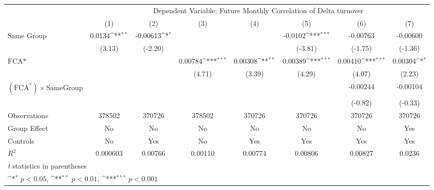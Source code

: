 {
\def\sym#1{\ifmmode^{#1}\else\(^{#1}\)\fi}
\begin{tabular}{l*{7}{c}}
\hline\hline
                &\multicolumn{7}{c}{Dependent Variable: Future Monthly Correlation of Delta turnover}                                                \\\cmidrule(lr){2-8}
                &\multicolumn{1}{c}{(1)}         &\multicolumn{1}{c}{(2)}         &\multicolumn{1}{c}{(3)}         &\multicolumn{1}{c}{(4)}         &\multicolumn{1}{c}{(5)}         &\multicolumn{1}{c}{(6)}         &\multicolumn{1}{c}{(7)}         \\
\hline
Same Group      &   0.0134\sym{**} & -0.00613\sym{*}  &                  &                  &  -0.0102\sym{***}& -0.00763         & -0.00600         \\
                &   (3.13)         &  (-2.20)         &                  &                  &  (-3.81)         &  (-1.75)         &  (-1.36)         \\
[1em]
$ \text{FCA*} $ &                  &                  &  0.00784\sym{***}&  0.00308\sym{**} &  0.00389\sym{***}&  0.00410\sym{***}&  0.00304\sym{*}  \\
                &                  &                  &   (4.71)         &   (3.39)         &   (4.29)         &   (4.07)         &   (2.23)         \\
[1em]
 $ (\text{FCA}^*) \times {\text{SameGroup} }  $ &                  &                  &                  &                  &                  & -0.00244         & -0.00104         \\
                &                  &                  &                  &                  &                  &  (-0.82)         &  (-0.33)         \\
\hline
Observations    &   378502         &   370726         &   378502         &   370726         &   370726         &   370726         &   370726         \\
Group Effect    &       No         &       No         &       No         &       No         &       No         &       No         &      Yes         \\
Controls        &       No         &      Yes         &       No         &      Yes         &      Yes         &      Yes         &      Yes         \\
$ R^2 $         & 0.000603         &  0.00766         &  0.00110         &  0.00774         &  0.00806         &  0.00827         &   0.0236         \\
\hline\hline
\multicolumn{8}{l}{\footnotesize \textit{t} statistics in parentheses}\\
\multicolumn{8}{l}{\footnotesize \sym{*} \(p<0.05\), \sym{**} \(p<0.01\), \sym{***} \(p<0.001\)}\\
\end{tabular}
}
